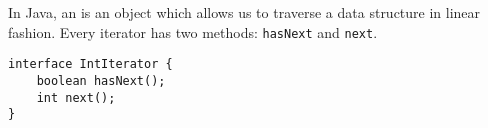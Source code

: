 In Java, an  is an object which allows us to traverse a data
structure in linear fashion. Every iterator has two methods: \lstinline$hasNext$ and \lstinline$next$.
\vspace{-6mm}
\begin{lstlisting}
interface IntIterator {
    boolean hasNext();
    int next();
}
\end{lstlisting}
